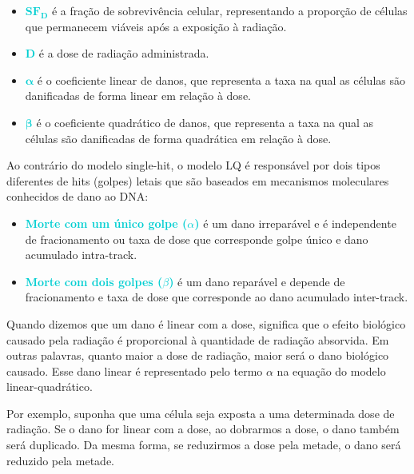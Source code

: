 \documentclass[11pt,a4paper]{article}
\newcounter{exemplo}
\begin{document}
	\begin{exemplo}[onde,]
		\begin{itemize}
			\item \textcolor{DarkTurquoise}{$\mathbf{SF_D}$} é a fração de sobrevivência celular, representando a proporção de células que permanecem viáveis após a exposição à radiação.
			\item \textcolor{DarkTurquoise}{$\mathbf{D}$} é a dose de radiação administrada.
			\item \textcolor{DarkTurquoise}{$\mathbf{\alpha}$} é o coeficiente linear de danos, que representa a taxa na qual as células são danificadas de forma linear em relação à dose.
			\item \textcolor{DarkTurquoise}{$\mathbf{\beta}$} é o coeficiente quadrático de danos, que representa a taxa na qual as células são danificadas de forma quadrática em relação à dose.
		\end{itemize}
	\end{exemplo}

	Ao contrário do modelo single-hit, o modelo LQ é responsável por dois tipos diferentes de hits (golpes) letais que são baseados em mecanismos moleculares conhecidos de dano ao DNA:
	
	\begin{itemize}[label=\textcolor{CarnationPink}{$\blacktriangleright$}]
		\item \textcolor{DarkTurquoise}{\textbf{Morte com um único golpe ($\alpha$)}} é um dano irreparável e é independente de fracionamento ou taxa de dose que corresponde golpe único e dano acumulado intra-track.
		\item \textcolor{DarkTurquoise}{\textbf{Morte com dois golpes ($\beta$)}} é um dano reparável e depende de fracionamento e taxa de dose que corresponde ao dano acumulado inter-track.
	\end{itemize}

	Quando dizemos que um dano é linear com a dose, significa que o efeito biológico causado pela radiação é proporcional à quantidade de radiação absorvida. Em outras palavras, quanto maior a dose de radiação, maior será o dano biológico causado. Esse dano linear é representado pelo termo $\alpha$ na equação do modelo linear-quadrático.

	Por exemplo, suponha que uma célula seja exposta a uma determinada dose de radiação. Se o dano for linear com a dose, ao dobrarmos a dose, o dano também será duplicado. Da mesma forma, se reduzirmos a dose pela metade, o dano será reduzido pela metade.
\end{document}
